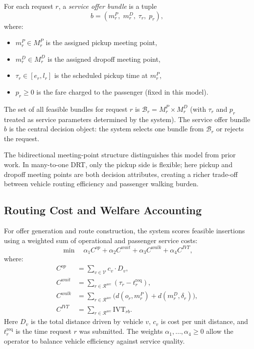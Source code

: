 For each request $r$, a \emph{service offer bundle} is a tuple
\[
  b = (m_r^P,\; m_r^D,\; \tau_r,\; p_r),
\]
where:
\begin{itemize}
  \item $m_r^P \in M_r^P$ is the assigned pickup meeting point,
  \item $m_r^D \in M_r^D$ is the assigned dropoff meeting point,
  \item $\tau_r \in [e_r, l_r]$ is the scheduled pickup time at $m_r^P$,
  \item $p_r \geq 0$ is the fare charged to the passenger (fixed in this model).
\end{itemize}
The set of all feasible bundles for request $r$ is $\mathcal{B}_r = M_r^P \times M_r^D$
(with $\tau_r$ and $p_r$ treated as service parameters determined by the system).
The service offer bundle $b$ is the central decision object: the system selects one bundle
from $\mathcal{B}_r$ or rejects the request.

The bidirectional meeting-point structure distinguishes this model from prior work. In
many-to-one DRT, only the pickup side is flexible; here pickup and dropoff meeting
points are both decision attributes, creating a richer trade-off between vehicle routing efficiency
and passenger walking burden.

\subsection{Routing Cost and Welfare Accounting}

For offer generation and route construction, the system scores feasible insertions using
a weighted sum of operational and passenger service costs:
\begin{equation}\label{eq:objective}
  \min \quad \alpha_1 C^{op} + \alpha_2 C^{wait} + \alpha_3 C^{walk}
             + \alpha_4 C^{IVT},
\end{equation}
where:
\begin{align}
  C^{op}   &= \sum_{v \in \mathcal{V}} c_v \cdot D_v, \label{eq:cop}\\
  C^{wait} &= \sum_{r \in \mathcal{R}^{\text{acc}}} (\tau_r - t_r^{\text{req}}), \label{eq:cwait}\\
  C^{walk} &= \sum_{r \in \mathcal{R}^{\text{acc}}} \bigl(d(o_r, m_r^P) + d(m_r^D, \delta_r)\bigr), \label{eq:cwalk}\\
  C^{IVT}  &= \sum_{r \in \mathcal{R}^{\text{acc}}} \text{IVT}_{rb}. \label{eq:civt}
\end{align}
Here $D_v$ is the total distance driven by vehicle $v$, $c_v$ is cost per unit distance,
and $t_r^{\text{req}}$ is the time request $r$ was submitted.
The weights $\alpha_1, \ldots, \alpha_4 \geq 0$ allow the operator to balance
vehicle efficiency against service quality.

